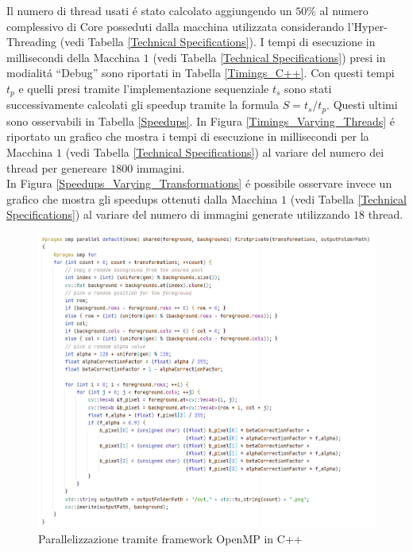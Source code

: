 \documentclass{article}
\begin{document}
\noindent Il numero di thread usati \'e stato calcolato aggiungendo un
$50\%$ al numero complessivo di Core posseduti dalla macchina utilizzata considerando l’Hyper-Threading (vedi Tabella \ref{Technical Specifications}). I tempi di esecuzione in millisecondi della Macchina $ 1 $ (vedi Tabella \ref{Technical Specifications}) presi in modialit\'a “Debug” sono riportati in Tabella \ref{Timings_C++}. Con questi tempi $t_{p}$ e quelli presi tramite l’implementazione sequenziale $t_{s}$ sono stati successivamente calcolati gli speedup tramite la formula $S=t_{s}/t_{p}$. Questi ultimi sono osservabili in Tabella \ref{Speedups}.
\newpage
\noindent In Figura \ref{Timings_Varying_Threads} \'e riportato un grafico che mostra i tempi di esecuzione in millisecondi per la Macchina $ 1 $ (vedi Tabella \ref{Technical Specifications}) al variare del numero dei thread per genereare $ 1800 $ immagini.\\ In Figura \ref{Speedups_Varying_Transformations} \'e possibile osservare invece un grafico che mostra gli speedups ottenuti dalla Macchina $ 1 $ (vedi Tabella \ref{Technical Specifications}) al variare del numero di immagini generate utilizzando $ 18 $ thread.

\begin{figure}[!h]
\centering
\includegraphics[width= 13cm]{"Immagini/OpenMP.PNG"}
\caption{Parallelizzazione tramite framework OpenMP in C++}
\label{OpenMP}
\end{figure}
\end{document}
